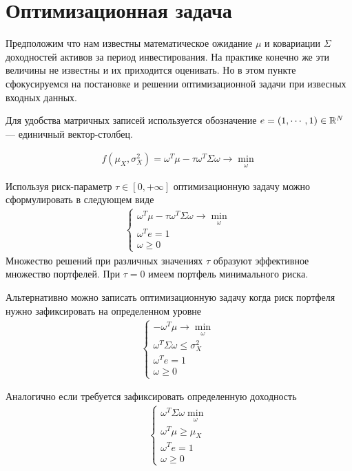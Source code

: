 \section{Оптимизационная задача}

Предположим что нам известны математическое ожидание $\mu$ и ковариации $\Sigma$ доходностей активов за период инвестирования.
На практике конечно же эти величины не известны и их приходится оценивать. Но в этом пункте сфокусируемся
на постановке и решении оптимизационной задачи при извесных входных данных.

Для удобства матричных записей используется обозначение $e = (1, \cdots, 1) \in \mathbb{R}^N$ --- единичный вектор-столбец.


\begin{align}
	f\left(\mu_X, \sigma_X^2 \right) = \omega^T \mu - \tau \omega^T \Sigma \omega \rightarrow \min_{\omega}
\end{align}



Используя риск-параметр $\tau \in [0, +\infty]$ оптимизационную задачу можно сформулировать в следующем виде
\begin{align}
	\begin{cases}
		\omega^T \mu - \tau \omega^T \Sigma \omega \rightarrow \min_{\omega} \\
		\omega^T e = 1 \\
		\omega \ge 0
	\end{cases}
\end{align}
Множество решений при различных значениях $\tau$ образуют эффективное множество портфелей.
При $\tau = 0$ имеем портфель минимального риска.

Альтернативно можно записать оптимизационную задачу когда риск портфеля нужно зафиксировать на определенном уровне
\begin{align}
	\begin{cases}
		-\omega^T \mu \rightarrow \min_{\omega} \\
		\omega^T \Sigma \omega \le \sigma_X^2 \\
		\omega^T e = 1 \\
		\omega \ge 0
	\end{cases}
\end{align}

Аналогично если требуется зафиксировать определенную доходность
\begin{align}
	\begin{cases}
		\omega^T \Sigma \omega \min_{\omega} \\
		\omega^T \mu \ge \mu_X \\
		\omega^T e = 1 \\
		\omega \ge 0
	\end{cases}
\end{align}

